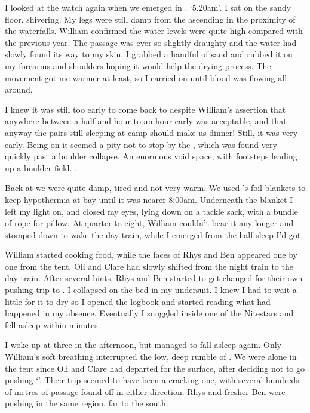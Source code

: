 I looked at the watch again when we emerged in . `5.20am'. I sat on the sandy floor, shivering. My legs were still damp from the ascending in the proximity of the waterfalls. William confirmed the water levels were quite high compared with the previous year. The passage was ever so slightly draughty and the water had slowly found its way to my skin. I grabbed a handful of sand and rubbed it on my forearms and shoulders hoping it would help the drying process. The movement got me warmer at least, so I carried on until blood was flowing all around.

I knew it was still too early to come back to  despite William's assertion that anywhere between a half-and hour to an hour early was acceptable, and that anyway the pairs still sleeping at camp should make us dinner! Still, it was very early. Being on  it seemed a pity not to stop by the , which was found very quickly past a boulder collapse. An enormous void space, with footsteps leading up a boulder field. .

Back at  we were quite damp, tired and not very warm. We used 's foil blankets to keep hypothermia at bay until it was nearer 8:00am. Underneath the blanket I left my light on, and closed my eyes, lying down on a tackle sack, with a bundle of rope for pillow. At quarter to eight, William couldn't bear it any longer and stomped down  to wake the day train, while I emerged from the half-sleep I'd got.

William started cooking food, while the faces of Rhys and Ben appeared one by one from the tent. Oli and Clare had slowly shifted from the night train to the day train. After several hints, Rhys and Ben started to get changed for their own pushing trip to . I collapsed on the bed in my undersuit. I knew I had to wait a little for it to dry so I opened the logbook and started reading what had happened in my absence. Eventually I snuggled inside one of the Nitestars and fell asleep within minutes.

I woke up at three in the afternoon, but managed to fall asleep again. Only William's soft breathing interrupted the low, deep rumble of . We were alone in the tent since Oli and Clare had departed for the surface, after deciding not to go pushing `'. Their trip seemed to have been a cracking one, with several hundreds of metres of passage found off  in either direction. Rhys and fresher Ben were pushing in the same region, far to the south.

